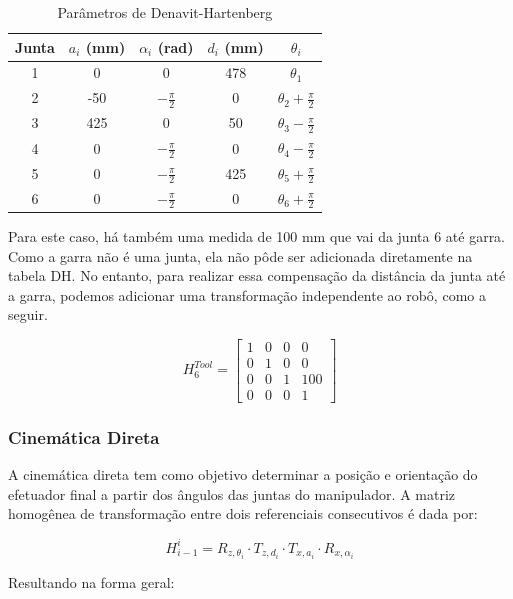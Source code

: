 \begin{table}[H]
\centering
\caption{Parâmetros de Denavit-Hartenberg}
\label{tab:dh}
\begin{tabular}{ccccc}
\hline
Junta & $a_i$ (mm) & $\alpha_i$ (rad) & $d_i$ (mm) & $\theta_i$ \\
\hline
1 & 0  & 0 & 478 & $\theta_1$ \\
2 & -50 & $-\frac{\pi}{2}$ & 0 & $\theta_2 + \frac{\pi}{2}$ \\
3 & 425 & 0  & 50   & $\theta_3 - \frac{\pi}{2}$\\
4 & 0   & $-\frac{\pi}{2}$ & 0   & $\theta_4 - \frac{\pi}{2}$ \\
5 & 0   & $-\frac{\pi}{2}$  & 425   & $\theta_5 + \frac{\pi}{2}$ \\
6 & 0   & $-\frac{\pi}{2}$ & 0 & $\theta_6 + \frac{\pi}{2}$ \\
\hline
\end{tabular}
\end{table}

Para este caso, há também uma medida de 100 mm que vai da junta 6 até garra. Como a garra não é uma junta, ela não pôde ser adicionada diretamente na tabela DH. No entanto, para realizar essa compensação da distância da junta até a garra, podemos adicionar uma transformação independente ao robô, como a seguir.

\begin{equation}
H_6^{Tool} =
\begin{bmatrix}
1 & 0 & 0 & 0 \\
0 & 1 & 0 & 0 \\
0 & 0 & 1 & 100 \\
0 & 0 & 0 & 1
\end{bmatrix}
\end{equation}

\subsubsection{Cinemática Direta}

A cinemática direta tem como objetivo determinar a posição e orientação do efetuador final a partir dos ângulos das juntas do manipulador. A matriz homogênea de transformação entre dois referenciais consecutivos é dada por:

\begin{equation}
H_{i-1}^i =
R_{z,\theta_i}
\cdot
T_{z,d_i}
\cdot
T_{x,a_i}
\cdot
R_{x,\alpha_i}
\end{equation}

Resultando na forma geral:

